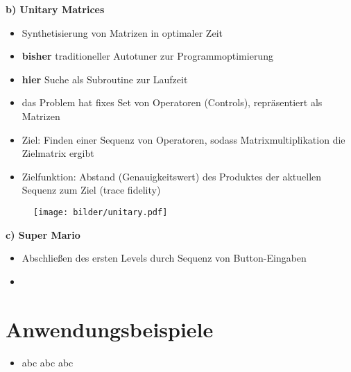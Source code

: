   \begin{frame}
   \textbf{b) Unitary Matrices}
   
    \begin{itemize}
      \item Synthetisierung von Matrizen in optimaler Zeit
      \item \textbf{bisher} traditioneller Autotuner zur Programmoptimierung
      \item \textbf{hier} Suche als Subroutine zur Laufzeit
      \item das Problem hat fixes Set von Operatoren (Controls), repräsentiert als Matrizen
      \item Ziel: Finden einer Sequenz von Operatoren, sodass Matrixmultiplikation die Zielmatrix ergibt
      \item Zielfunktion: Abstand (Genauigkeitswert) des Produktes der aktuellen Sequenz zum Ziel (trace fidelity)
    \end{itemize}
  \end{frame}
  
\begin{frame}
    \begin{figure}[ht]
      \centering	      
      \texttt{[image: bilder/unitary.pdf]}
      \label{gccpy1a}
    \end{figure}
\end{frame}

\begin{frame}
   \textbf{c) Super Mario}
   
   \begin{itemize}
    \item Abschließen des ersten Levels durch Sequenz von Button-Eingaben 
    \item
   \end{itemize}
   
\end{frame}


  
    \section{Anwendungsbeispiele}
    
    \begin{frame}
    \begin{itemize}
      \item abc abc abc
    \end{itemize}
    \end{frame}
    
